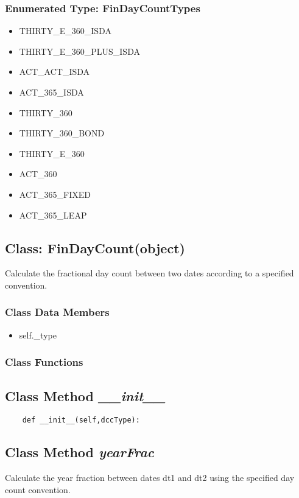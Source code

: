 \documentclass[twoside,11pt]{book}
\begin{document}
\subsubsection{Enumerated Type: FinDayCountTypes}
\begin{itemize}
\item{THIRTY\_E\_360\_ISDA}
\item{THIRTY\_E\_360\_PLUS\_ISDA}
\item{ACT\_ACT\_ISDA}
\item{ACT\_365\_ISDA}
\item{THIRTY\_360}
\item{THIRTY\_360\_BOND}
\item{THIRTY\_E\_360}
\item{ACT\_360}
\item{ACT\_365\_FIXED}
\item{ACT\_365\_LEAP}
\end{itemize}

\subsection{Class: FinDayCount(object)}
Calculate the fractional day count between two dates according to a specified convention. 

\subsubsection{Class Data Members}
\begin{itemize}
\item{self.\_type}
\end{itemize}

\subsubsection{Class Functions}

\subsection{Class Method {\it \_\_init\_\_}}


\begin{lstlisting}
    def __init__(self,dccType):
\end{lstlisting}

\subsection{Class Method {\it yearFrac}}
Calculate the year fraction between dates dt1 and dt2 using the specified day count convention. 
\end{document}
